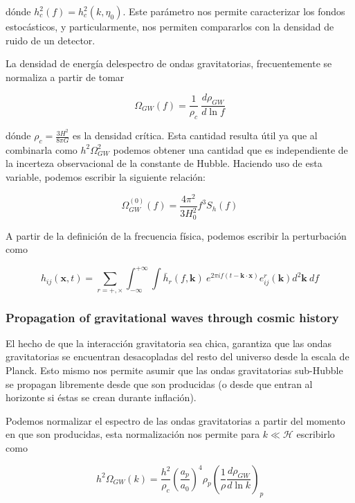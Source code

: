 \noindent
dónde $h_c^2 (f) = h^2_c (k, \eta_0)$. Este parámetro nos permite caracterizar los fondos estocásticos, y particularmente, nos permiten compararlos con la densidad de ruido de un detector.

La densidad de energía delespectro de ondas gravitatorias, frecuentemente se normaliza a partir de tomar

\begin{equation}
    \Omega_{GW} (f) = \frac{1}{\rho_c} \ \frac{d \rho_{GW}}{d \ln f}
\end{equation}

\noindent
dónde $\rho_c = \displaystyle \frac{3 H^2}{8 \pi G}$ es la densidad crítica. Esta cantidad resulta útil ya que al combinarla como $h^2 \Omega_{GW}^2$ podemos obtener una cantidad que es independiente de la incerteza observacional de la constante de Hubble. Haciendo uso de esta variable, podemos escribir la siguiente relación:

\begin{equation}
    \Omega^{(0)}_{GW} (f) = \frac{4 \pi^2}{3 H_0^2} f^3 S_h (f)
\end{equation}

A partir de la definición de la frecuencia física, podemos escribir la perturbación como

\begin{equation}
    h_{ij} (\textbf{x}, t) = \sum_{r = +, \times}\int_{-\infty}^{+\infty} \int \bar{h}_r (f, \textbf{k}) \ e^{2 \pi i f (t - \textbf{k} \cdot \textbf{x})} e_{ij}^r (\textbf{k}) d^2 \textbf{k} \ df
\end{equation}

\subsubsection{Propagation of gravitational waves through cosmic history}

El hecho de que la interacción gravitatoria sea chica, garantiza que las ondas gravitatorias se encuentran desacopladas del resto del universo desde la escala de Planck. Esto mismo nos permite asumir que las ondas gravitatorias sub-Hubble se propagan libremente desde que son producidas (o desde que entran al horizonte si éstas se crean durante inflación).

Podemos normalizar el espectro de las ondas gravitatorias a partir del momento en que son producidas, esta normalización nos permite para $k \ll \mathcal{H}$ escribirlo como

\begin{equation}
    h^2 \Omega_{GW} (k) = \frac{h^2}{\rho_c} \left( \frac{a_p}{a_0} \right)^4 \rho_p \left( \frac{1}{\rho} \frac{d \rho_{GW}}{d \ln k} \right)_p
\end{equation}


